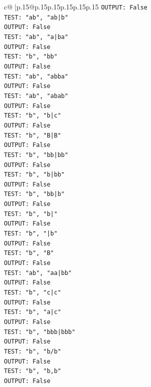 \documentclass{article}
\begin{document}
{\begin{supertabular}{c@{$\;$}|p{.15\linewidth}@{}p{.15\linewidth}p{.15\linewidth}p{.15\linewidth}p{.15\linewidth}p{.15\linewidth}}
{{{\texttt{OUTPUT: False} \\
\texttt{TEST: "ab", "ab|b"} \\
\texttt{OUTPUT: False} \\
\texttt{TEST: "ab", "a|ba"} \\
\texttt{OUTPUT: False} \\
\texttt{TEST: "b", "bb"} \\
\texttt{OUTPUT: False} \\
\texttt{TEST: "ab", "abba"} \\
\texttt{OUTPUT: False} \\
\texttt{TEST: "ab", "abab"} \\
\texttt{OUTPUT: False} \\
\texttt{TEST: "b", "b|c"} \\
\texttt{OUTPUT: False} \\
\texttt{TEST: "b", "B|B"} \\
\texttt{OUTPUT: False} \\
\texttt{TEST: "b", "bb|bb"} \\
\texttt{OUTPUT: False} \\
\texttt{TEST: "b", "b|bb"} \\
\texttt{OUTPUT: False} \\
\texttt{TEST: "b", "bb|b"} \\
\texttt{OUTPUT: False} \\
\texttt{TEST: "b", "b|"} \\
\texttt{OUTPUT: False} \\
\texttt{TEST: "b", "|b"} \\
\texttt{OUTPUT: False} \\
\texttt{TEST: "b", "B"} \\
\texttt{OUTPUT: False} \\
\texttt{TEST: "ab", "aa|bb"} \\
\texttt{OUTPUT: False} \\
\texttt{TEST: "b", "c|c"} \\
\texttt{OUTPUT: False} \\
\texttt{TEST: "b", "a|c"} \\
\texttt{OUTPUT: False} \\
\texttt{TEST: "b", "bbb|bbb"} \\
\texttt{OUTPUT: False} \\
\texttt{TEST: "b", "b/b"} \\
\texttt{OUTPUT: False} \\
\texttt{TEST: "b", "b,b"} \\
\texttt{OUTPUT: False} \\
}}}
\end{supertabular}}
\end{document}
